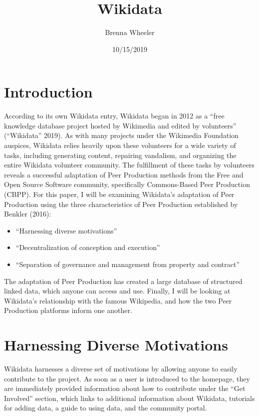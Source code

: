 \documentclass[]{article}
\title{Wikidata}
\author{Brenna Wheeler}
\date{10/15/2019}
\begin{document}
\maketitle

\hypertarget{introduction}{%
\section{Introduction}\label{introduction}}

According to its own Wikidata entry, Wikidata began in 2012 as a ``free
knowledge database project hosted by Wikimedia and edited by
volunteers'' (``Wikidata'' 2019). As with many projects under the
Wikimedia Foundation auspices, Wikidata relies heavily upon these
volunteers for a wide variety of tasks, including generating content,
repairing vandalism, and organizing the entire Wikidata volunteer
community. The fulfillment of these tasks by volunteers reveals a
successful adaptation of Peer Production methods from the Free and Open
Source Software community, specifically Commons-Based Peer Production
(CBPP). For this paper, I will be examining Wikidata's adaptation of
Peer Production using the three characteristics of Peer Production
established by Benkler (2016):

\begin{itemize}
\item
  ``Harnessing diverse motivations''
\item
  ``Decentralization of conception and execution''
\item
  ``Separation of governance and management from property and contract''
\end{itemize}

The adaptation of Peer Production has created a large database of
structured linked data, which anyone can access and use. Finally, I will
be looking at Wikidata's relationship with the famous Wikipedia, and how
the two Peer Production platforms inform one another.

\hypertarget{harnessing-diverse-motivations}{%
\section{Harnessing Diverse
Motivations}\label{harnessing-diverse-motivations}}

Wikidata harnesses a diverse set of motivations by allowing anyone to
easily contribute to the project. As soon as a user is introduced to the
homepage, they are immediately provided information about how to
contribute under the ``Get Involved'' section, which links to additional
information about Wikidata, tutorials for adding data, a guide to using
data, and the community portal.
\end{document}

